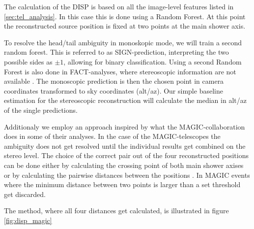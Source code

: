 The calculation of the DISP is based on all the image-level
features listed in \ref{sec:tel_analysis}.
In this case this is done using a Random Forest.
At this point the reconstructed source position
is fixed at two points at the main shower axis.

To resolve the head/tail ambiguity in monoskopic mode,
we will train a second random forest.
This is referred to as SIGN-prediction, interpreting the two possible sides
as $\pm1$, allowing for binary classification.
Using a second Random Forest is also done in FACT-analyses,
where stereoscopic information are not available \cite{fact_sign_performance}.
The monoscopic prediction is then the chosen point in camera coordinates transformed
to sky coordinates (alt/az).
Our simple baseline estimation for the stereoscopic reconstruction will 
calculate the median in alt/az of the single predictions.

Additionaly we employ an approach inspired by 
what the MAGIC-collaboration does in some of their analyses.
In the case of the MAGIC-telescopes the ambiguity does not
get resolved until the individual results get combined
on the stereo level. The choice of the correct
pair out of the four reconstructed positions can be done either
by calculating the crossing point of both main shower axises
or by calculating the pairwise distances between the positions \cite{ALEKSIC201676}.
In MAGIC events where the minimum distance between two points is larger than a set threshold
get discarded.

The method, where all four distances get calculated, is illustrated in figure \ref{fig:disp_magic}

